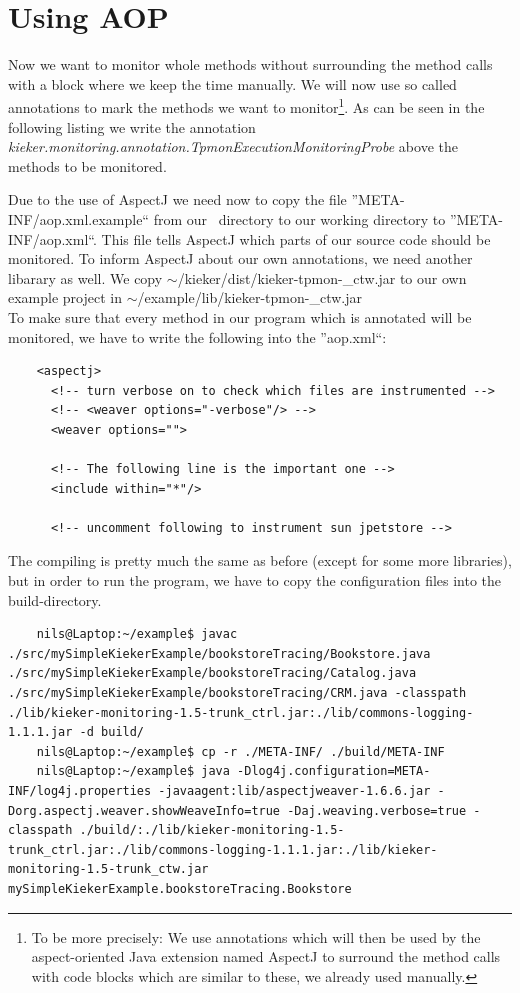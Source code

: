     \section{Using AOP}
      Now we want to monitor whole methods without surrounding the method calls with a block where we keep the time manually. We will now use so called annotations to mark the methods we want to monitor\footnote{To be more precisely: We use annotations which will then be used by the aspect-oriented Java extension named AspectJ to surround the method calls with code blocks which are similar to these, we already used manually.}. As can be seen in the following listing we write the annotation \textit{kieker.monitoring.annotation.TpmonExecutionMonitoringProbe} above the methods to be monitored. 
      \setJavaCodeListing
      
      Due to the use of AspectJ we need now to copy the file ''META-INF/aop.xml.example`` from our \Kieker\ directory to our working directory to ''META-INF/aop.xml``. This file tells AspectJ which parts of our source code should be monitored. To inform AspectJ about our own annotations, we need another libarary as well. We copy $\sim$/kieker/dist/kieker-tpmon-\version\_ctw.jar to our own example project in $\sim$/example/lib/kieker-tpmon-\version\_ctw.jar\\
      To make sure that every method in our program which is annotated will be monitored, we have to write the following into the ''aop.xml``:
      \setXMLListing 
      \begin{lstlisting}
	<aspectj>
	  <!-- turn verbose on to check which files are instrumented -->
	  <!-- <weaver options="-verbose"/> -->
	  <weaver options="">
	      
	  <!-- The following line is the important one -->
	  <include within="*"/> 

	  <!-- uncomment following to instrument sun jpetstore -->
      \end{lstlisting}
      The compiling is pretty much the same as before (except for some more libraries), but in order to run the program, we have to copy the configuration files into the build-directory.
      \begin{lstlisting}
	nils@Laptop:~/example$ javac ./src/mySimpleKiekerExample/bookstoreTracing/Bookstore.java ./src/mySimpleKiekerExample/bookstoreTracing/Catalog.java ./src/mySimpleKiekerExample/bookstoreTracing/CRM.java -classpath ./lib/kieker-monitoring-1.5-trunk_ctrl.jar:./lib/commons-logging-1.1.1.jar -d build/
	nils@Laptop:~/example$ cp -r ./META-INF/ ./build/META-INF
	nils@Laptop:~/example$ java -Dlog4j.configuration=META-INF/log4j.properties -javaagent:lib/aspectjweaver-1.6.6.jar -Dorg.aspectj.weaver.showWeaveInfo=true -Daj.weaving.verbose=true -classpath ./build/:./lib/kieker-monitoring-1.5-trunk_ctrl.jar:./lib/commons-logging-1.1.1.jar:./lib/kieker-monitoring-1.5-trunk_ctw.jar mySimpleKiekerExample.bookstoreTracing.Bookstore
      \end{lstlisting}